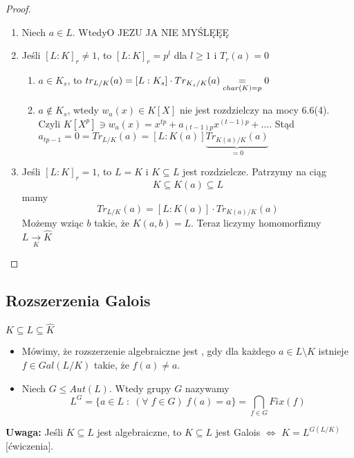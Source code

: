 \begin{proof}
\begin{enumerate}[leftmargin=*]
    \item Niech $a\in L$. Wtedy{\large\color{orange}O JEZU JA NIE MYŚLĘĘĘ}
    \item Jeśli $[L:K]_r\neq 1$, to $[L:K]_r=p^l$ dla $l\geq 1$ i $T_r(a)=0$
    \begin{enumerate}
        \item $a\in K_s$, to $tr_{L/K}(a)=[L:K_s]\cdot Tr_{K_s/K}(a)\underset{{\scriptsize char(K)=p}}{=}0$
        \item $a\notin K_s$, wtedy $w_a(x)\in K[X]$ nie jest rozdzielczy na mocy 6.6(4). Czyli $K[X^p]\ni w_a(x)=x^{tp}+a_{(t-1)p}x^{(t-1)p}+...$. Stąd $a_{tp-1}=0=Tr_{L/K}(a)=[L:K(a)]\underbrace{Tr_{K(a)/K}(a)}_{=0}$
    \end{enumerate}
    \item Jeśli $[L:K]_r=1$, to $L=K$ i $K\subseteq L$ jest rozdzielcze. Patrzymy na ciąg
    $$K\subseteq K(a)\subseteq L$$
    mamy
    $$Tr_{L/K}(a)=[L:K(a)]\cdot Tr_{K(a)/K}(a)$$
    Możemy wziąc $b$ takie, że $K(a,b)=L$. Teraz liczymy homomorfizmy $L\underset{K}{\to} \hat{K}$
\end{enumerate}
\end{proof}

\subsection{Rozszerzenia Galois}
\begin{bbox}
$K\subseteq L\subseteq\hat{K}$
\begin{itemize}
    \item[\PHtunny] Mówimy, że rozszerzenie algebraiczne jest , gdy dla każdego $a\in L\setminus K$ istnieje $f\in Gal(L/K)$ takie, że $f(a)\neq a$.
    \item[\PHtunny] Niech $G\leq Aut(L)$. Wtedy  grupy $G$ nazywamy 
    $$L^G=\{a\in L\;:\;(\forall\;f\in G)\;f(a)=a\}=\bigcap_{f\in G}Fix(f)$$
\end{itemize}
\end{bbox}

\textbf{Uwaga:} Jeśli $K\subseteq L$ jest algebraiczne, to $K\subseteq L$ jest Galois $\iff$ $K=L^{G(L/K)}$ [ćwiczenia].

